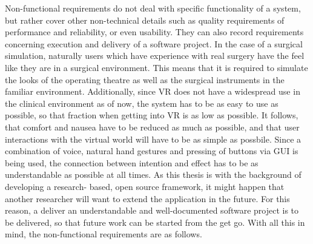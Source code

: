 Non-functional requirements do not deal with specific functionality of a system, but rather cover other non-technical details such as quality requirements of performance and reliability, or even usability.
They can also record requirements concerning execution and delivery of a software project.
\newline
In the case of a surgical simulation, naturally users which have experience with real surgery have the feel like they are in a surgical environment.
This means that it is required to simulate the looks of the operating theatre as well as the surgical instruments in the familiar environment.
Additionally, since VR does not have a widespread use in the clinical environment as of now, the system has to be as easy to use as possible, so that fraction when getting into VR is as low as possible.
It follows, that comfort and nausea have to be reduced as much as possible, and that user interactions with the virtual world will have to be as simple as possbile.
Since a combination of voice, natural hand gestures and pressing of buttons via GUI is being used, the connection between intention and effect has to be as understandable as possible at all times.
As this thesis is with the background of developing a research- based, open source framework, it might happen that another researcher will want to extend the application in the future.
For this reason, a deliver an understandable and well-documented software project is to be delivered, so that future work can be started from the get go.
With all this in mind, the non-functional requirements are as follows.


